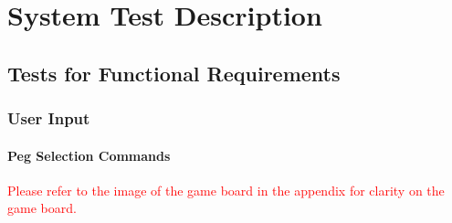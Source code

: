 \documentclass[12pt, titlepage]{article}
\begin{document}
\section{System Test Description}
	
\subsection{Tests for Functional Requirements}

\subsubsection{User Input}
		
\paragraph{Peg Selection Commands}
\textcolor{red}{Please refer to the image of the game board in the appendix for clarity on the game board.}
\end{document}
